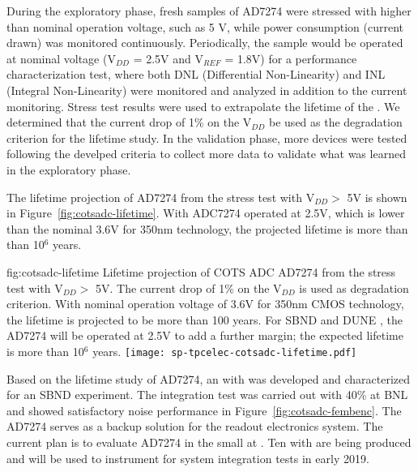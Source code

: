 During the exploratory phase, fresh samples of   AD7274 were stressed with higher than nominal operation voltage, such as 5 V, while power consumption (current drawn) was monitored continuously. Periodically, the sample would be operated at nominal voltage (V$_{DD}$ = 2.5V and V$_{REF}$ = 1.8V) for a performance characterization test, where both DNL (Differential Non-Linearity) and INL (Integral Non-Linearity)  were monitored and analyzed in addition to the current monitoring. Stress test results were used to extrapolate the lifetime of the  . We determined that the current drop of 1\% on the V$_{DD}$ be used as the degradation criterion for the lifetime study. In the validation phase, more devices were tested following the develped criteria to collect more data to validate what was learned in the exploratory phase.

The lifetime projection of   AD7274 from the stress test with V$_{DD} >$ 5V is shown in Figure~\ref{fig:cotsadc-lifetime}. With ADC7274 operated at 2.5V, which is lower than the nominal 3.6V for 350nm  technology, the projected lifetime is more than than 10$^6$ years.

\begin{dunefigure}
{fig:cotsadc-lifetime}
	{Lifetime projection of COTS ADC AD7274 from the stress test with V$_{DD} >$ 5V. The current drop of 1\% on the V$_{DD}$ is used as degradation criterion. With nominal operation voltage of 3.6V for 350nm CMOS technology, the lifetime is projected to be more than 100 years. For SBND and DUNE , the AD7274 will be operated at 2.5V to add a further margin; the expected lifetime is more than 10$^6$ years.}
\texttt{[image: sp-tpcelec-cotsadc-lifetime.pdf]}
\end{dunefigure}

Based on the lifetime study of AD7274, an  with   was developed and characterized for an SBND experiment. The integration test was carried out with 40\%  at BNL and showed satisfactory noise performance in Figure~\ref{fig:cotsadc-fembenc}. The   AD7274 serves as a backup solution for the    readout electronics system. The current plan is to evaluate AD7274  in the small   at . Ten  with   are being produced and will be used to instrument   for system integration tests in early 2019. 

